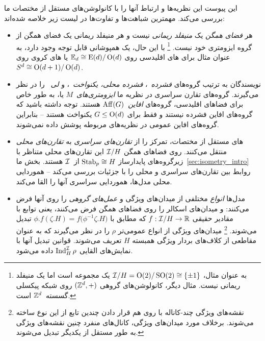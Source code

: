 این پیوست این نظریه‌ها و ارتباط آنها را با کانولوشن‌های مستقل از مختصات ما بررسی می‌کند.
مهمترین شباهت‌ها و تفاوت‌ها در لیست زیر خلاصه شده‌اند:
\begin{itemize}
	\item[{\rule[2.2pt]{2pt}{2pt}}]
	هر \emph{فضای همگن} یک \emph{منیفلد ریمانی} نیست و هر منیفلد ریمانی یک فضای همگن از گروه ایزومتری خود نیست.%
	\footnote{
		به عنوان مثال، $\mathcal{I}/H = \operatorname{O}(2)/\operatorname{SO}(2) \cong \{\pm1\}$ یک مجموعه است اما یک منیفلد ریمانی نیست.
		مثال دیگر، کانولوشن‌های گروهی $(\mathbb{Z}^d,+)$ روی شبکه پیکسلی گسسته~$\mathbb{Z}^d$ است.
	}
	با این حال، یک همپوشانی قابل توجه وجود دارد، به عنوان مثال برای های اقلیدسی روی $\mathbb{E}_d \cong \operatorname{E}(d)/\operatorname{O}(d)$ یا های کروی روی $S^d \cong \operatorname{O}(d+1)/\operatorname{O}(d)$.
	\item[{\rule[2.2pt]{2pt}{2pt}}]
	نویسندگان به ترتیب گروه‌های \emph{فشرده}~\cite{Kondor2018-GENERAL}، \emph{فشرده محلی، یکنواخت}~\cite{Cohen2018-intertwiners}\cite{Cohen2019-generaltheory}، و \emph{لی}~\cite{bekkers2020bspline} را در نظر می‌گیرند.
	گروه‌های تقارن سراسری در نظریه ما \emph{ایزومتری‌های}~$M$ یا، به طور خاص برای فضاهای اقلیدسی، گروه‌های \emph{افاین}~$\operatorname{Aff}(G)$ هستند.
	توجه داشته باشید که گروه‌های افاین فشرده نیستند و فقط برای $G\leq\operatorname{O}(d)$ یکنواخت هستند -- بنابراین گروه‌های افاین عمومی در نظریه‌های مربوطه پوشش داده نمی‌شوند.
	\item[{\rule[2.2pt]{2pt}{2pt}}]
	های مستقل از مختصات، تمرکز را از \emph{تقارن‌های سراسری} به \emph{تقارن‌های محلی} منتقل می‌کنند.
	روی فضاهای همگن $\mathcal{I}/H$ این تقارن‌های محلی متناظر با زیرگروه‌های پایدارساز $\operatorname{Stab}_{p} \cong H$ از~$\mathcal{I}$ هستند.
	بخش ما~\ref{sec:isometry_intro} روابط بین تقارن‌های سراسری و محلی را با جزئیات بررسی می‌کند --
	هموردایی محلی مدل‌ها، هموردایی سراسری آنها را القا می‌کند.
	\item[{\rule[2.2pt]{2pt}{2pt}}]
	مدل‌ها \emph{انواع} مختلفی از میدان‌های ویژگی و \emph{عمل‌های گروهی} را روی آنها فرض می‌کنند:
	\citet{Kondor2018-GENERAL} و \citet{bekkers2020bspline} میدان‌های اسکالر را روی فضاهای همگن فرض می‌کنند، یعنی توابع با مقادیر حقیقی ${f: \mathcal{I}/H \to \mathbb{R}}$ که مطابق با
	$\phi.f (\zeta.H) = f\big( \phi^{-1} \zeta.H \big)$ تبدیل می‌شوند.%
	\footnote{
		نقشه‌های ویژگی چند-کاناله با روی هم قرار دادن چندین تابع از این نوع ساخته می‌شوند.
		برخلاف مورد میدان‌های ویژگی، کانال‌های منفرد چنین نقشه‌های ویژگی به طور مستقل از یکدیگر تبدیل می‌شوند.
	}
	\citet{Cohen2018-intertwiners}\cite{Cohen2019-generaltheory} میدان‌های ویژگی از انواع عمومی‌تر $\rho$ را در نظر می‌گیرند
	که به عنوان مقاطعی از کلاف‌های بردار ویژگی همبسته $H$ تعریف می‌شوند.
	قوانین تبدیل آنها با نمایش‌های القایی $\operatorname{Ind}_H^{\mathcal{I}} \rho$ داده می‌شود.

\end{itemize}
